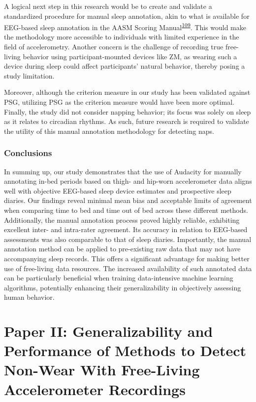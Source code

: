 \documentclass[
  9pt,
]{scrbook}
\begin{document}
A logical next step in this research would be to create and validate a
standardized procedure for manual sleep annotation, akin to what is
available for EEG-based sleep annotation in the AASM Scoring
Manual\textsuperscript{\protect\hyperlink{ref-aasm}{109}}. This would
make the methodology more accessible to individuals with limited
experience in the field of accelerometry. Another concern is the
challenge of recording true free-living behavior using
participant-mounted devices like ZM, as wearing such a device during
sleep could affect participants' natural behavior, thereby posing a
study limitation.

Moreover, although the criterion measure in our study has been validated
against PSG, utilizing PSG as the criterion measure would have been more
optimal. Finally, the study did not consider napping behavior; its focus
was solely on sleep as it relates to circadian rhythms. As such, future
research is required to validate the utility of this manual annotation
methodology for detecting naps.

\hypertarget{conclusions}{%
\subsection{Conclusions}\label{conclusions}}

In summing up, our study demonstrates that the use of Audacity for
manually annotating in-bed periods based on thigh- and hip-worn
accelerometer data aligns well with objective EEG-based sleep device
estimates and prospective sleep diaries. Our findings reveal minimal
mean bias and acceptable limits of agreement when comparing time to bed
and time out of bed across these different methods. Additionally, the
manual annotation process proved highly reliable, exhibiting excellent
inter- and intra-rater agreement. Its accuracy in relation to EEG-based
assessments was also comparable to that of sleep diaries. Importantly,
the manual annotation method can be applied to pre-existing raw data
that may not have accompanying sleep records. This offers a significant
advantage for making better use of free-living data resources. The
increased availability of such annotated data can be particularly
beneficial when training data-intensive machine learning algorithms,
potentially enhancing their generalizability in objectively assessing
human behavior.

\newpage

\hypertarget{paper-ii-generalizability-and-performance-of-methods-to-detect-non-wear-with-free-living-accelerometer-recordings}{%
\chapter{Paper II: Generalizability and Performance of Methods to Detect
Non-Wear With Free-Living Accelerometer
Recordings}\label{paper-ii-generalizability-and-performance-of-methods-to-detect-non-wear-with-free-living-accelerometer-recordings}}
\end{document}
